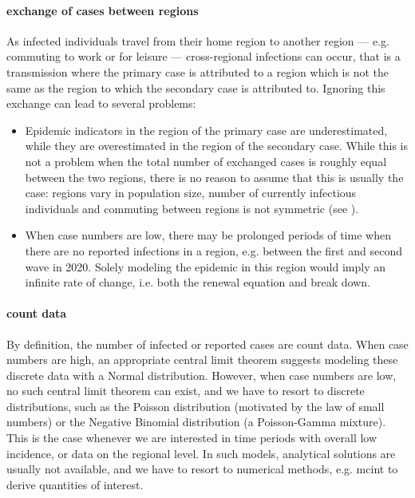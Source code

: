 \paragraph{exchange of cases between regions}
As infected individuals travel from their home region to another region --- e.g. commuting to work or for leisure --- cross-regional infections can occur, that is a transmission where the primary case is attributed to a region which is not the same as the region to which the secondary case is attributed to. Ignoring this exchange can lead to several problems:
\begin{itemize}
    \item Epidemic indicators in the region of the primary case are underestimated, while they are overestimated in the region of the secondary case. While this is not a problem when the total number of exchanged cases is roughly equal between the two regions, there is no reason to assume that this is usually the case: regions vary in population size, number of currently infectious individuals and commuting between regions is not symmetric (see ). 
    \item When case numbers are low, there may be prolonged periods of time when there are no reported infections in a region, e.g. between the first and second wave in 2020. Solely modeling the epidemic in this region would imply an infinite rate of change, i.e. both the renewal equation  and  break down.
\end{itemize}

\paragraph{count data}
By definition, the number of infected or reported cases are count data. When case numbers are high, an appropriate central limit theorem suggests modeling these discrete data with a Normal distribution. However, when case numbers are low, no such central limit theorem can exist, and we have to resort to discrete distributions, such as the Poisson distribution (motivated by the law of small numbers) or the Negative Binomial distribution (a Poisson-Gamma mixture). This is the case whenever we are interested in time periods with overall low incidence, or data on the regional level.
In such models, analytical solutions are usually not available, and we have to resort to numerical methods, e.g. \acrshort{mcint} to derive quantities of interest.